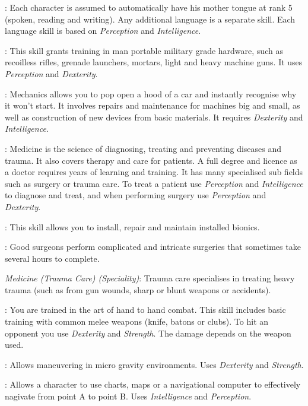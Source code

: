 : Each character is assumed to automatically have his mother
tongue at rank 5 (spoken, reading and writing). Any additional language is a
separate skill. Each language skill is based on \emph{Perception} and
\emph{Intelligence}.

: This skill grants training in man portable military
grade hardware, such as recoilless rifles, grenade launchers, mortars, light
and heavy machine guns. It uses \emph{Perception} and \emph{Dexterity}.

: Mechanics allows you to pop open a hood of a car and instantly
recognise why it won't start. It involves repairs and maintenance for machines
big and small, as well as construction of new devices from basic materials. It
requires \emph{Dexterity} and \emph{Intelligence}.

: Medicine is the science of diagnosing, treating and
preventing diseases and trauma. It also covers therapy and care for patients.
A full degree and licence as a doctor requires years of learning and training.
It has many specialised sub fields such as surgery or trauma care. To treat a
patient use \emph{Perception} and \emph{Intelligence} to diagnose and treat,
and when performing surgery use \emph{Perception} and \emph{Dexterity}.

: This skill allows you to install, repair
and maintain installed bionics.

: Good surgeons perform complicated and
intricate surgeries that sometimes take several hours to complete.

\emph{Medicine (Trauma Care) (Speciality)}: Trauma care specialises in treating
heavy trauma (such as from gun wounds, sharp or blunt weapons or accidents).

: You are trained in the art of hand to hand combat. This
skill includes basic training with common melee weapons (knife, batons or
clubs). To hit an opponent you use \emph{Dexterity} and \emph{Strength}.
The damage depends on the weapon used.

: Allows maneuvering in micro gravity environments. Uses
\emph{Dexterity} and \emph{Strength}.

: Allows a character to use charts, maps or a navigational
computer to effectively nagivate from point A to point B. Uses
\emph{Intelligence} and \emph{Perception}.

